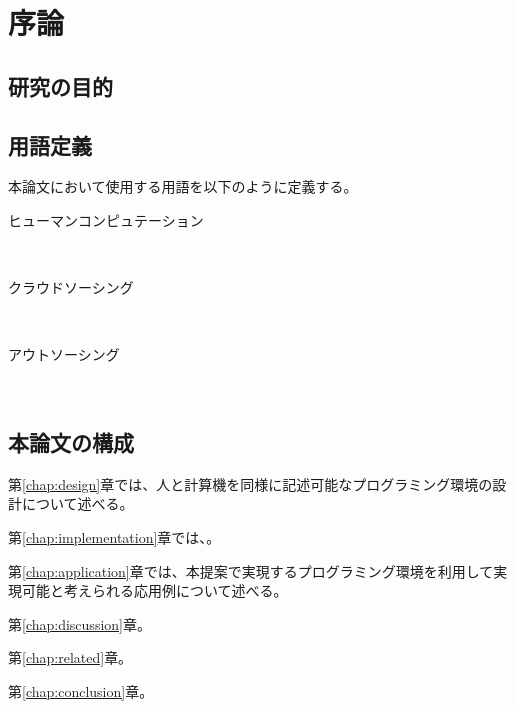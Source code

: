 \chapter{序論}
\label{chap:introduction}

\section{研究の目的}

\section{用語定義}

本論文において使用する用語を以下のように定義する。

\begin{description}
  \item [ヒューマンコンピュテーション] \mbox{}\\
  \item [クラウドソーシング] \mbox{}\\
  \item [アウトソーシング] \mbox{}\\

\end{description}

\section{本論文の構成}

第\ref{chap:design}章では、人と計算機を同様に記述可能なプログラミング環境の設計について述べる。

第\ref{chap:implementation}章では、。

第\ref{chap:application}章では、本提案で実現するプログラミング環境を利用して実現可能と考えられる応用例について述べる。

第\ref{chap:discussion}章。

第\ref{chap:related}章。

第\ref{chap:conclusion}章。
